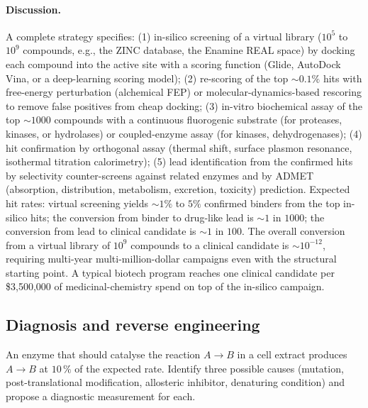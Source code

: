 \paragraph{Discussion.}
A complete strategy specifies: (1) in-silico screening of a virtual
library ($10^5$ to $10^9$ compounds, e.g., the ZINC database, the
Enamine REAL space) by docking each compound into the active site
with a scoring function (Glide, AutoDock Vina, or a deep-learning
scoring model); (2) re-scoring of the top $\sim 0.1\%$ hits with
free-energy perturbation (alchemical FEP) or molecular-dynamics-based
rescoring to remove false positives from cheap docking; (3) in-vitro
biochemical assay of the top $\sim 1000$ compounds with a continuous
fluorogenic substrate (for proteases, kinases, or hydrolases) or
coupled-enzyme assay (for kinases, dehydrogenases); (4) hit
confirmation by orthogonal assay (thermal shift, surface plasmon
resonance, isothermal titration calorimetry); (5) lead identification
from the confirmed hits by selectivity counter-screens against
related enzymes and by ADMET (absorption, distribution, metabolism,
excretion, toxicity) prediction. Expected hit rates: virtual
screening yields $\sim 1\%$ to $5\%$ confirmed binders from the top
in-silico hits; the conversion from binder to drug-like lead is
$\sim 1$ in $1000$; the conversion from lead to clinical candidate is
$\sim 1$ in $100$. The overall conversion from a virtual library of
$10^9$ compounds to a clinical candidate is $\sim 10^{-12}$,
requiring multi-year multi-million-dollar campaigns even with the
structural starting point. A typical biotech program reaches one
clinical candidate per \$3{,}500{,}000 of medicinal-chemistry spend on
top of the in-silico campaign.

\subsection*{Diagnosis and reverse engineering}

\begin{exercise}
An enzyme that should catalyse the reaction $A \rightarrow B$ in a
cell extract produces $A \rightarrow B$ at $10\,\%$ of the expected
rate. Identify three possible causes (mutation, post-translational
modification, allosteric inhibitor, denaturing condition) and propose
a diagnostic measurement for each.
\end{exercise}

